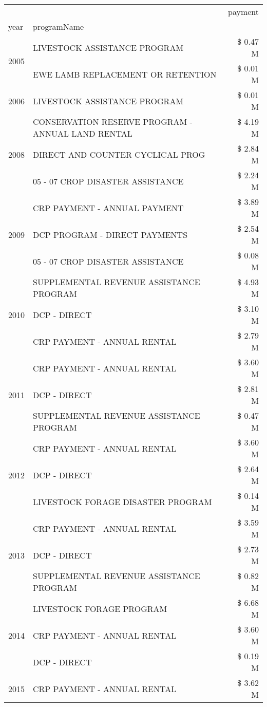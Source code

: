 \begin{tabular}{llr}
\toprule
 &  & payment \\
year & programName &  \\
\midrule
\multirow[t]{2}{*}{2005} & LIVESTOCK ASSISTANCE PROGRAM & \$ 0.47 M \\
 & EWE LAMB REPLACEMENT OR RETENTION & \$ 0.01 M \\
\cline{1-3}
2006 & LIVESTOCK ASSISTANCE PROGRAM & \$ 0.01 M \\
\cline{1-3}
\multirow[t]{3}{*}{2008} & CONSERVATION RESERVE PROGRAM - ANNUAL LAND RENTAL & \$ 4.19 M \\
 & DIRECT AND COUNTER CYCLICAL PROG & \$ 2.84 M \\
 & 05 - 07 CROP DISASTER ASSISTANCE & \$ 2.24 M \\
\cline{1-3}
\multirow[t]{3}{*}{2009} & CRP PAYMENT - ANNUAL PAYMENT & \$ 3.89 M \\
 & DCP PROGRAM - DIRECT PAYMENTS & \$ 2.54 M \\
 & 05 - 07 CROP DISASTER ASSISTANCE & \$ 0.08 M \\
\cline{1-3}
\multirow[t]{3}{*}{2010} & SUPPLEMENTAL REVENUE ASSISTANCE PROGRAM & \$ 4.93 M \\
 & DCP - DIRECT & \$ 3.10 M \\
 & CRP PAYMENT - ANNUAL RENTAL & \$ 2.79 M \\
\cline{1-3}
\multirow[t]{3}{*}{2011} & CRP PAYMENT - ANNUAL RENTAL & \$ 3.60 M \\
 & DCP - DIRECT & \$ 2.81 M \\
 & SUPPLEMENTAL REVENUE ASSISTANCE PROGRAM & \$ 0.47 M \\
\cline{1-3}
\multirow[t]{3}{*}{2012} & CRP PAYMENT - ANNUAL RENTAL & \$ 3.60 M \\
 & DCP - DIRECT & \$ 2.64 M \\
 & LIVESTOCK FORAGE DISASTER PROGRAM & \$ 0.14 M \\
\cline{1-3}
\multirow[t]{3}{*}{2013} & CRP PAYMENT - ANNUAL RENTAL & \$ 3.59 M \\
 & DCP - DIRECT & \$ 2.73 M \\
 & SUPPLEMENTAL REVENUE ASSISTANCE PROGRAM & \$ 0.82 M \\
\cline{1-3}
\multirow[t]{3}{*}{2014} & LIVESTOCK FORAGE PROGRAM & \$ 6.68 M \\
 & CRP PAYMENT - ANNUAL RENTAL & \$ 3.60 M \\
 & DCP - DIRECT & \$ 0.19 M \\
\cline{1-3}
\multirow[t]{3}{*}{2015} & CRP PAYMENT - ANNUAL RENTAL & \$ 3.62 M \\

\end{tabular}
